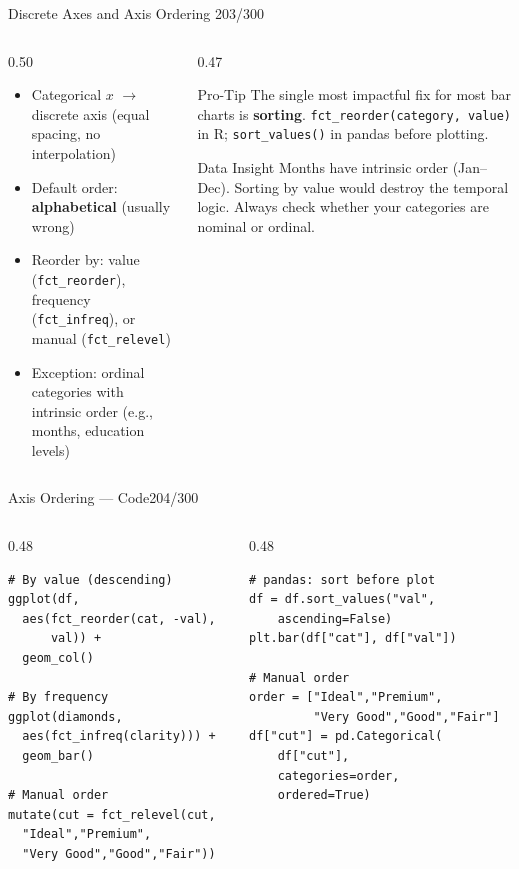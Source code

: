 \documentclass[10pt]{beamer}
\newcommand{\smark}[1]{\hfill{\scriptsize\color{codegray}#1}}
\begin{document}
\begin{frame}{Discrete Axes and Axis Ordering}
\smark{203/300}
\begin{columns}[T]
\begin{column}{0.50\textwidth}
\begin{itemize}
    \item Categorical $x$ $\to$ discrete axis (equal spacing, no interpolation)
    \item Default order: \textbf{alphabetical} (usually wrong)
    \item Reorder by: value (\texttt{fct\_reorder}), frequency (\texttt{fct\_infreq}), or manual (\texttt{fct\_relevel})
    \item Exception: ordinal categories with intrinsic order (e.g., months, education levels)
\end{itemize}
\end{column}
\begin{column}{0.47\textwidth}
\begin{alertblock}{Pro-Tip}
    \scriptsize The single most impactful fix for most bar charts is \textbf{sorting}. \texttt{fct\_reorder(category, value)} in R; \texttt{sort\_values()} in pandas before plotting.
\end{alertblock}
\vspace{0.2cm}
\begin{exampleblock}{Data Insight}
    \scriptsize Months have intrinsic order (Jan--Dec). Sorting by value would destroy the temporal logic. Always check whether your categories are nominal or ordinal.
\end{exampleblock}
\end{column}
\end{columns}
\end{frame}

\begin{frame}[fragile]{Axis Ordering --- Code}\smark{204/300}
\begin{columns}[T]
\begin{column}{0.48\textwidth}
\begin{lstlisting}[style=Rstyle]
# By value (descending)
ggplot(df,
  aes(fct_reorder(cat, -val),
      val)) +
  geom_col()

# By frequency
ggplot(diamonds,
  aes(fct_infreq(clarity))) +
  geom_bar()

# Manual order
mutate(cut = fct_relevel(cut,
  "Ideal","Premium",
  "Very Good","Good","Fair"))
\end{lstlisting}
\end{column}
\begin{column}{0.48\textwidth}
\begin{lstlisting}[style=Pystyle]
# pandas: sort before plot
df = df.sort_values("val",
    ascending=False)
plt.bar(df["cat"], df["val"])

# Manual order
order = ["Ideal","Premium",
         "Very Good","Good","Fair"]
df["cut"] = pd.Categorical(
    df["cut"],
    categories=order,
    ordered=True)
\end{lstlisting}
\end{column}
\end{columns}
\end{frame}
\end{document}
